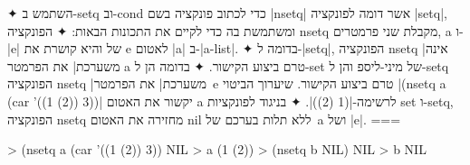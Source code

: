 \begin{enumerate}
  ✦ השתמש ב-setq וב-cond כדי לכתוב פונקציה בשם \E|nsetq| אשר דומה לפונקציה
  \E|setq|, ומשתמשת בה כדי לקיים את התכונות הבאות:
  ✦ הפונקציה nsetq מקבלת שני פרמטרים, a ו-\E|e| של והיא קושרת את e לאטום \E|a|
  ב-\E|a-list|.
  ✦ בדומה ל-\E|setq|, הפונקציה nsetq \ע|אינה משערכת| את הפרמטר a טרם ביצוע
  הקישור.
  ✦ בדומה הן ל-set של מיני-ליספ והן ל-setq הפונקציה nsetq \ע|משערכת| את
  הפרמטר~e טרם ביצוע הקישור. שיערוך הביטוי \T|(nsetq a (car '((1 (2)) 3))|
  יקשור את האטום a לרשימה-\T|(1 (2))|.
  ✦ בניגוד לפונקציות set ו-setq, הפונקציה nsetq מחזירה את האטום nil ללא תלות
  בערכם של~a ושל \E|e|.
===
  \begin{LISP}
> (nsetq a (car '((1 (2)) 3))
NIL
> a
(1 (2))
> (nsetq b NIL)
NIL
> b
NIL
\end{LISP}
\end{enumerate}
